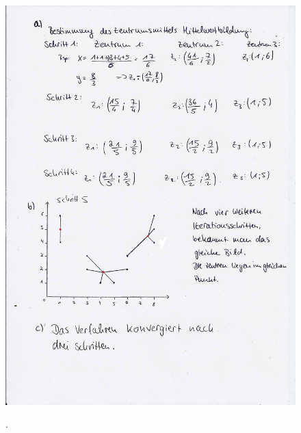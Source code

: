 \begin{figure}
  \centering
  \includegraphics[width=\textwidth]{PhotoScan2.jpg}
  \caption{}.
  \label{fig:2}
\end{figure}
\FloatBarrier
